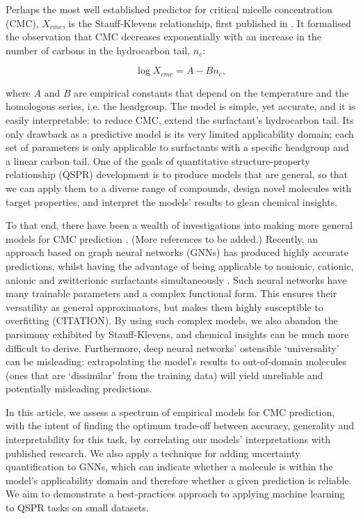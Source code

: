 Perhaps the most well established predictor for critical micelle concentration
(CMC), $X_{cmc}$, is the Stauff-Klevens relationship, first published in
\citeyear{klevensStructureAggregationDilate1953}
\cite{klevensStructureAggregationDilate1953}. It formalised the observation that
CMC decreases exponentially with an increase in the number of carbons in the
hydrocarbon tail, $n_c$:

\begin{equation}
    \label{eq:klevens}
    \log X_{cmc} = A - Bn_c,
\end{equation}

where $A$ and $B$ are empirical constants that depend on the temperature and the
homologous series, i.e. the headgroup. The model is simple, yet accurate, and it
is easily interpretable: to reduce CMC, extend the surfactant's hydrocarbon
tail. Its only drawback as a predictive model is its very limited applicability
domain; each set of parameters is only applicable to surfactants with a specific
headgroup and a linear carbon tail. One of the goals of quantitative
structure-property relationship (QSPR) development is to produce models that are
general, so that we can apply them to a diverse range of compounds, design novel
molecules with target properties, and interpret the models' results to glean
chemical insights.

To that end, there have been a wealth of investigations into making more general
models for CMC prediction
\cite{gaudinNewQSPRModels2016,jakobtorweihenPredictingCriticalMicelle2017,matteiModelingCriticalMicelle2013}.
(More references to be added.) Recently, an approach based on graph neural
networks (GNNs) has produced highly accurate predictions, whilst having the
advantage of being applicable to nonionic, cationic, anionic and zwitterionic
surfactants simultaneously \cite{qinPredictingCriticalMicelle2021a}. Such neural
networks have many trainable parameters and a complex functional form. This
ensures their versatility as general approximators, but makes them highly
susceptible to overfitting (CITATION). By using such complex models, we also
abandon the parsimony exhibited by Stauff-Klevens, and chemical insights can be
much more difficult to derive. Furthermore, deep neural networks' ostensible
`universality' can be misleading: extrapolating the model's results to
out-of-domain molecules (ones that are `dissimilar' from the training data) will
yield unreliable and potentially misleading predictions.

In this article, we assess a spectrum of empirical models for CMC prediction,
with the intent of finding the optimum trade-off between accuracy, generality
and interpretability for this task, by correlating our models' interpretations
with published research. We also apply a technique for adding uncertainty
quantification to GNNs, which can indicate whether a molecule is within the
model's applicability domain and therefore whether a given prediction is
reliable. We aim to demonstrate a best-practices approach to applying machine
learning to QSPR tasks on small datasets.
